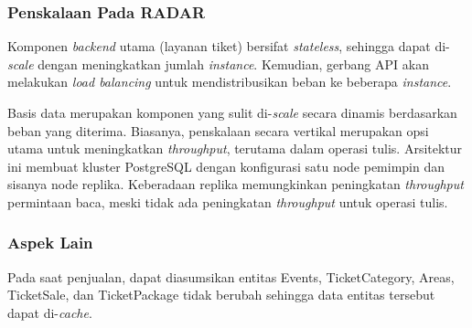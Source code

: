 \subsubsection{Penskalaan Pada RADAR}

Komponen \textit{backend} utama (layanan tiket) bersifat \textit{stateless}, sehingga dapat di-\textit{scale} dengan meningkatkan jumlah \textit{instance}. Kemudian, gerbang API akan melakukan \textit{load balancing} untuk mendistribusikan beban ke beberapa \textit{instance}.

Basis data merupakan komponen yang sulit di-\textit{scale} secara dinamis berdasarkan beban yang diterima. Biasanya, penskalaan secara vertikal merupakan opsi utama untuk meningkatkan \textit{throughput}, terutama dalam operasi tulis. Arsitektur ini membuat kluster PostgreSQL dengan konfigurasi satu node pemimpin dan sisanya node replika. Keberadaan replika memungkinkan peningkatan \textit{throughput} permintaan baca, meski tidak ada peningkatan \textit{throughput} untuk operasi tulis.

\subsubsection{Aspek Lain}

Pada saat penjualan, dapat diasumsikan entitas Events, TicketCategory, Areas, TicketSale, dan TicketPackage tidak berubah sehingga data entitas tersebut dapat di-\textit{cache}.